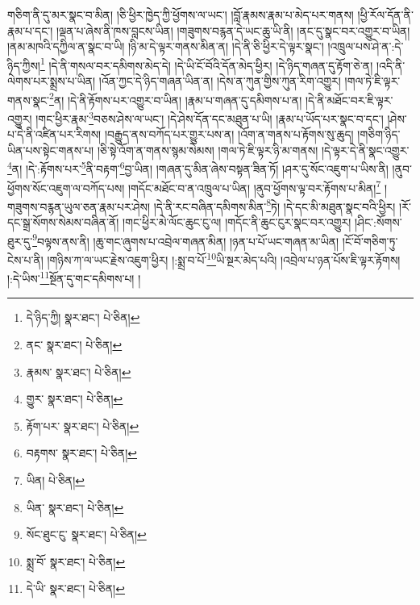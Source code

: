 གཅིག་ནི་དུ་མར་སྣང་བ་མིན། །ཅི་ཕྱིར་ཁྱེད་ཀྱི་ཕྱོགས་ལ་ཡང་། །བློ་རྣམས་རྣམ་པ་མེད་པར་གནས། །ཕྱི་རོལ་དོན་ནི་རྣམ་པ་དང་། །ལྡན་པ་ཞེས་ནི་ཁས་བླངས་ཡིན། །གཟུགས་བརྙན་དེ་ཡང་ཆུ་ཡི་ནི། །ནང་དུ་སྣང་བར་འགྱུར་བ་ཡིན། །ནམ་མཁའི་དཀྱིལ་ན་སྣང་བ་ཡི། །ཉི་མ་དེ་ལྟར་གནས་མིན་ན། །དེ་ནི་ཅི་ཕྱིར་དེ་ལྟར་སྣང་། །འཁྲུལ་པས་ཤེ་ན་:དེ་ཉིད་ཀྱིས།\footnote{དེ་ཉིད་ཀྱི།  སྣར་ཐང་།  པེ་ཅིན། } །དེ་ནི་གསལ་བར་དམིགས་མེད་དེ། །དེ་ཡི་ངོ་བོའི་དོན་མེད་ཕྱིར། །དེ་ཉིད་གཞན་དུ་རྟོག་ཅེ་ན། །འདི་ནི་ལེགས་པར་སྨྲས་པ་ཡིན། །འོན་ཀྱང་དེ་ཉིད་གཞན་ཡིན་ན། །དེས་ན་ཀུན་གྱིས་ཀུན་རིག་འགྱུར། །གལ་ཏེ་ཇི་ལྟར་གནས་སྣང་\footnote{ནང་  སྣར་ཐང་།  པེ་ཅིན། }ན། །དེ་ནི་རྟོགས་པར་འགྱུར་བ་ཡིན། །རྣམ་པ་གཞན་དུ་དམིགས་པ་ན། །དེ་ནི་མཐོང་བར་ཇི་ལྟར་འགྱུར། །གང་ཕྱིར་རྣམ་\footnote{རྣམས་  སྣར་ཐང་།  པེ་ཅིན། }བཅས་ཤེས་ལ་ཡང་། །དེ་ཤེས་དོན་དང་མཐུན་པ་ཡི། །རྣམ་པ་ཡོད་པར་སྣང་བ་དང་། །ཤེས་པ་དེ་ནི་འཛིན་པར་རིགས། །བརྒྱུད་ནས་བཀོད་པར་གྱུར་པས་ན། །འོག་ན་གནས་པ་རྟོགས་སུ་ཆུད། །གཅིག་ཉིད་ཡིན་པས་སྟེང་གནས་པ། །ཅི་སྟེ་འོག་ན་གནས་སྙམ་སེམས། །གལ་ཏེ་ཇི་ལྟར་ཉི་མ་གནས། །དེ་ལྟར་དེ་ནི་སྣང་འགྱུར་\footnote{གྱུར་  སྣར་ཐང་།  པེ་ཅིན། }ན། །དེ་:རྟོགས་པར་\footnote{རྟོག་པར་  སྣར་ཐང་།  པེ་ཅིན། }ནི་བརྟག་\footnote{བརྟགས་  སྣར་ཐང་།  པེ་ཅིན། }བྱ་ཡིན། །གཞན་དུ་མིན་ཞེས་བསྟན་ཟིན་ཏོ། །ཤར་དུ་སོང་འཇུག་པ་ཡིས་ནི། །ནུབ་ཕྱོགས་སོང་འཇུག་ལ་བཀོད་པས། །གདོང་མཐོང་བ་ན་འཁྲུལ་པ་ཡིན། །ནུབ་ཕྱོགས་ལྟ་བར་རྟོགས་པ་མིན།\footnote{ཡིན།  པེ་ཅིན། } །གཟུགས་བརྙན་ཡུལ་ཅན་རྣམ་པར་ཤེས། །དེ་ནི་རང་བཞིན་དམིགས་མིན་\footnote{ཡིན་  སྣར་ཐང་།  པེ་ཅིན། }ཏེ། །དེ་དང་མི་མཐུན་སྣང་བའི་ཕྱིར། །རོ་དང་སྒྲ་སོགས་སེམས་བཞིན་ནོ། །གང་ཕྱིར་མེ་ལོང་ཆུང་ངུ་ལ། །གདོང་ནི་ཆུང་ངུར་སྣང་བར་འགྱུར། །ཤིང་:སོགས་ཐུར་དུ་\footnote{སོང་ཐུང་ངུ་  སྣར་ཐང་།  པེ་ཅིན། }བལྟས་ནས་ནི། །ཆུ་གང་ཞུགས་པ་འབྲེལ་གཞན་མིན། །ཉན་པ་པོ་ཡང་གཞན་མ་ཡིན། །ངོ་བོ་གཅིག་ཏུ་ངེས་པ་ནི། །གཉིས་ཀ་ལ་ཡང་རྗེས་འཇུག་ཕྱིར། །:སྨྲ་བ་པོ་\footnote{སྨྲ་བོ་  སྣར་ཐང་།  པེ་ཅིན། }ཡི་སྔར་མེད་པའི། །འབྲེལ་པ་ཉན་པོས་ཇི་ལྟར་རྟོགས། །:དེ་ཡིས་\footnote{དེ་ཡི་  སྣར་ཐང་།  པེ་ཅིན། }སྔོན་དུ་གང་དམིགས་པ། །

